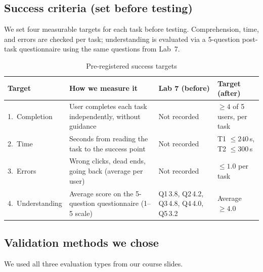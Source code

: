 \documentclass[10pt,a4paper]{article}
\begin{document}
\subsection{Success criteria (set before testing)}

We set four measurable targets for each task before testing.
Comprehension, time, and errors are checked per task; understanding is evaluated via a 5-question post-task questionnaire using the same questions from Lab~7.

\begin{table}[H]
\centering
\caption{Pre-registered success targets}
\label{tab:targets}
\begin{tabularx}{\textwidth}{l X l l}
\toprule
\textbf{Target} & \textbf{How we measure it} & \textbf{Lab 7 (before)} & \textbf{Target (after)} \\
\midrule
1.~Completion &
  User completes each task independently, without guidance &
  Not recorded &
  $\geq 4$ of 5 users, per task \\[4pt]
2.~Time &
  Seconds from reading the task to the success point &
  Not recorded &
  T1 $\leq 240$\,s, T2 $\leq 300$\,s \\[4pt]
3.~Errors &
  Wrong clicks, dead ends, going back (average per user) &
  Not recorded &
  $\leq 1.0$ per task \\[4pt]
4.~Understanding &
  Average score on the 5-question questionnaire (1--5 scale) &
  Q1\,3.8, Q2\,4.2, Q3\,4.8, Q4\,4.0, Q5\,3.2 &
  Average $\geq 4.0$ \\
\bottomrule
\end{tabularx}
\end{table}

\subsection{Validation methods we chose}

We used all three evaluation types from our course slides.
\end{document}

